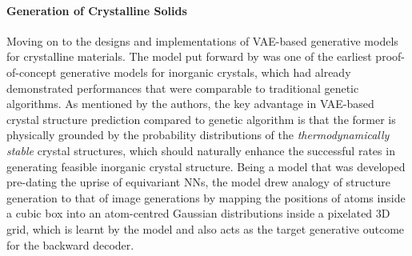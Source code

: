 \paragraph{\textbf{Generation of Crystalline Solids}}
Moving on to the designs and implementations of VAE-based generative models for crystalline materials. The model put forward by \citet{noh2019inverse} was one of the earliest proof-of-concept generative models for  inorganic crystals, which had already demonstrated performances that were comparable to traditional genetic algorithms. As mentioned by the authors, the key advantage in VAE-based crystal structure prediction compared to genetic algorithm is that the former is physically grounded by the probability distributions of the \emph{thermodynamically stable} crystal structures, which should naturally enhance the successful rates in generating feasible inorganic crystal structure. Being a model that was developed pre-dating the uprise of equivariant NNs, the model drew analogy of structure generation to that of image generations by mapping the positions of atoms inside a cubic box into an atom-centred Gaussian distributions inside a pixelated 3D grid, which is learnt by the model and also acts as the target generative outcome for the backward decoder.


